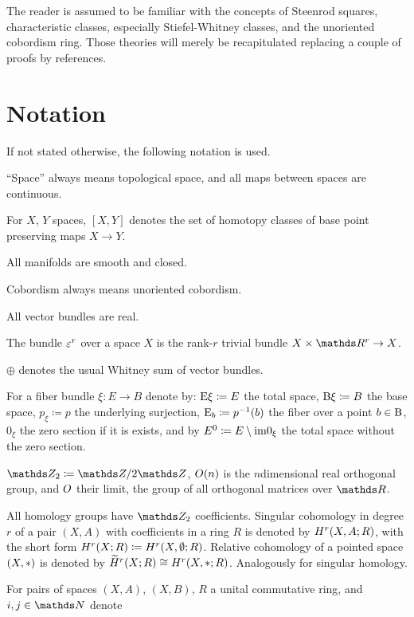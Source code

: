 The reader is assumed to be familiar with the concepts of Steenrod
squares, characteristic classes, especially Stiefel-Whitney classes,
and the unoriented cobordism ring. Those theories will merely be
recapitulated replacing a couple of proofs by references.

\section*{Notation}
If not stated otherwise, the following notation is used.
\begin{compactitemize}[leftmargin=*]
\item \enquote{Space} always means topological space, and all maps
  between spaces are continuous.
\item For $X$, $Y$ spaces, $[X,Y]$ denotes the set of homotopy classes
  of base point preserving maps $X\to Y$.
\item All manifolds are smooth and closed.
\item Cobordism always means unoriented cobordism.
\item All vector bundles are real.
\item The bundle $\varepsilon^r$ over a space $X$ is the rank-$r$ trivial
  bundle $X\times\R^r\to X$.
\item $\oplus$ denotes the usual Whitney sum of vector bundles.
\item For a fiber bundle $\xi\colon E\to B$ denote by:
  $\mathrm{E}\xi\coloneqq E$ the total space,
  $\mathrm{B}\xi\coloneqq B$ the base space,
  $p_\xi\coloneqq p$ the underlying surjection,
  $\mathrm{E}_b\coloneqq p^{-1}(b)$ the fiber over a point $b\in \B$,
  $0_\xi$ the zero section if it is exists, and by
  ${E}^0\coloneqq E\setminus\mathrm{im}0_{\xi}$
  the total space without the zero section.
\item $\Zmod2 \coloneqq \Z/2\Z$,
  $O(n)$ is the $n$\nbd{}dimensional real orthogonal group, and
  $O$ their limit, \idest the group of all orthogonal matrices
  over $\R$.
\item All homology groups have $\Zmod2$ coefficients. Singular
  cohomology in degree $r$ of a pair $(X,A)$ with 
  coefficients in a ring $R$ is denoted by $H^r(X,A;R)$, with the
  short form $H^r(X;R)\coloneqq H^r(X,\emptyset;R)$. Relative cohomology
  of a pointed space $(X,*)$ is denoted by
  $\widetilde{H}^r(X;R)\cong H^r(X,*;R)$.
  Analogously for singular homology.
\item For pairs of spaces $(X,A)$, $(X,B)$, $R$ a unital commutative
  ring, and $i,j\in\Nat$ denote

\end{compactitemize}
